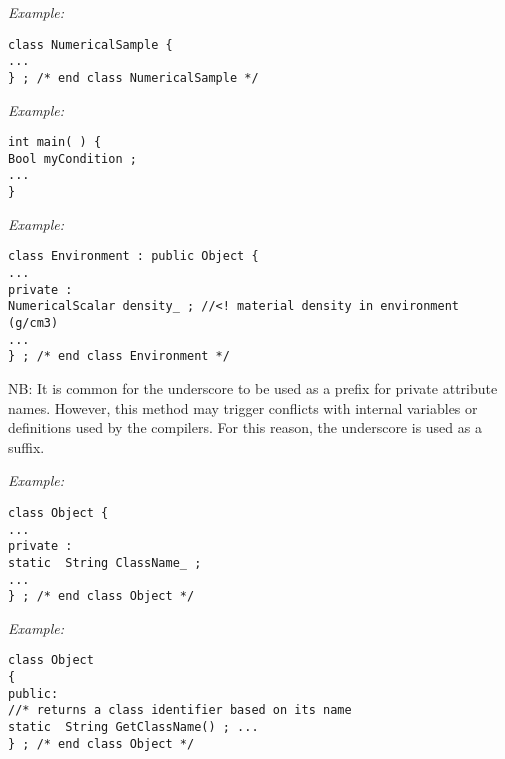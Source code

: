 \emph{Example:}
\lstset{language=C++, basicstyle=\normalsize}
\begin{lstlisting}[frame=TBRL]
class NumericalSample {
...
} ; /* end class NumericalSample */
\end{lstlisting}


\emph{Example:}
\lstset{language=C++, basicstyle=\normalsize}
\begin{lstlisting}[frame=TBRL]
int main( ) {
Bool myCondition ;
...
}
\end{lstlisting}


\emph{Example:}
\lstset{language=C++, basicstyle=\normalsize}
\begin{lstlisting}[frame=TBRL]
class Environment : public Object {
...
private :
NumericalScalar density_ ; //<! material density in environment (g/cm3)
...
} ; /* end class Environment */
\end{lstlisting}
NB: It is common for the underscore to be used as a prefix for private attribute names. However, this method may trigger conflicts with internal variables or definitions used by the compilers. For this reason, the underscore is used as a suffix.


\emph{Example:}
\lstset{language=C++, basicstyle=\normalsize}
\begin{lstlisting}[frame=TBRL]
class Object {
...
private :
static  String ClassName_ ;
...
} ; /* end class Object */
\end{lstlisting}


\emph{Example:}
\lstset{language=C++, basicstyle=\normalsize}
\begin{lstlisting}[frame=TBRL]
class Object
{
public:
//* returns a class identifier based on its name
static  String GetClassName() ; ...
} ; /* end class Object */
\end{lstlisting}

